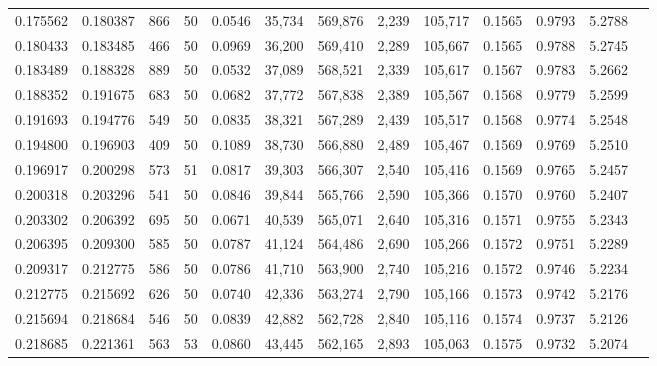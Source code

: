 \begin{tabular}{rrrrrrrrrrrrr}
0.175562 & 0.180387 &   866 &  50 &                                     0.0546 &  35,734 & 569,876 &   2,239 & 105,717 & 0.1565 & 0.9793 & 5.2788 \\
0.180433 & 0.183485 &   466 &  50 &                                     0.0969 &  36,200 & 569,410 &   2,289 & 105,667 & 0.1565 & 0.9788 & 5.2745 \\
0.183489 & 0.188328 &   889 &  50 &                                     0.0532 &  37,089 & 568,521 &   2,339 & 105,617 & 0.1567 & 0.9783 & 5.2662 \\
0.188352 & 0.191675 &   683 &  50 &                                     0.0682 &  37,772 & 567,838 &   2,389 & 105,567 & 0.1568 & 0.9779 & 5.2599 \\
0.191693 & 0.194776 &   549 &  50 &                                     0.0835 &  38,321 & 567,289 &   2,439 & 105,517 & 0.1568 & 0.9774 & 5.2548 \\
0.194800 & 0.196903 &   409 &  50 &                                     0.1089 &  38,730 & 566,880 &   2,489 & 105,467 & 0.1569 & 0.9769 & 5.2510 \\
0.196917 & 0.200298 &   573 &  51 &                                     0.0817 &  39,303 & 566,307 &   2,540 & 105,416 & 0.1569 & 0.9765 & 5.2457 \\
0.200318 & 0.203296 &   541 &  50 &                                     0.0846 &  39,844 & 565,766 &   2,590 & 105,366 & 0.1570 & 0.9760 & 5.2407 \\
0.203302 & 0.206392 &   695 &  50 &                                     0.0671 &  40,539 & 565,071 &   2,640 & 105,316 & 0.1571 & 0.9755 & 5.2343 \\
0.206395 & 0.209300 &   585 &  50 &                                     0.0787 &  41,124 & 564,486 &   2,690 & 105,266 & 0.1572 & 0.9751 & 5.2289 \\
0.209317 & 0.212775 &   586 &  50 &                                     0.0786 &  41,710 & 563,900 &   2,740 & 105,216 & 0.1572 & 0.9746 & 5.2234 \\
0.212775 & 0.215692 &   626 &  50 &                                     0.0740 &  42,336 & 563,274 &   2,790 & 105,166 & 0.1573 & 0.9742 & 5.2176 \\
0.215694 & 0.218684 &   546 &  50 &                                     0.0839 &  42,882 & 562,728 &   2,840 & 105,116 & 0.1574 & 0.9737 & 5.2126 \\
0.218685 & 0.221361 &   563 &  53 &                                     0.0860 &  43,445 & 562,165 &   2,893 & 105,063 & 0.1575 & 0.9732 & 5.2074 \\

\end{tabular}
